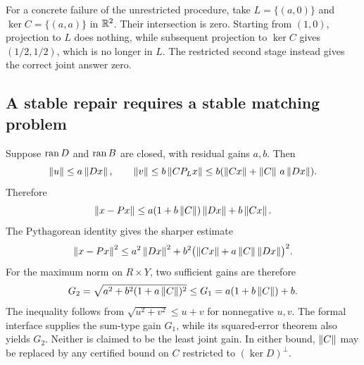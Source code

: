 For a concrete failure of the unrestricted procedure, take \(L=\{(a,0)\}\) and \(\ker C=\{(a,a)\}\) in \(\mathbb R^2\). Their intersection is zero. Starting from \((1,0)\), projection to \(L\) does nothing, while subsequent projection to \(\ker C\) gives \((1/2,1/2)\), which is no longer in \(L\). The restricted second stage instead gives the correct joint answer zero.


\subsection{A stable repair requires a stable matching problem}
Suppose \(\operatorname{ran} D\) and \(\operatorname{ran} B\) are closed, with residual gains \(a,b\). Then
\[
 \left\lVert u\right\rVert\le a\left\lVert Dx\right\rVert,\qquad
 \left\lVert v\right\rVert\le b\left\lVert CP_Lx\right\rVert
 \le b(\left\lVert Cx\right\rVert+\left\lVert C\right\rVert\,a\left\lVert Dx\right\rVert).
\]
Therefore
\begin{equation}\label{eq:jointgain}
 \left\lVert x-Px\right\rVert\le
 a(1+b\left\lVert C\right\rVert)\left\lVert Dx\right\rVert+b\left\lVert Cx\right\rVert.
\end{equation}
The Pythagorean identity gives the sharper estimate
\[
 \left\lVert x-Px\right\rVert^2\le
 a^2\left\lVert Dx\right\rVert^2+b^2\bigl(\left\lVert Cx\right\rVert+a\left\lVert C\right\rVert\left\lVert Dx\right\rVert\bigr)^2.
\]
For the maximum norm on \(R\times Y\), two sufficient gains are therefore
\[
 G_2=\sqrt{a^2+b^2(1+a\left\lVert C\right\rVert)^2}
 \le G_1=a(1+b\left\lVert C\right\rVert)+b.
\]
The inequality follows from \(\sqrt{u^2+v^2}\le u+v\) for nonnegative \(u,v\). The formal interface supplies the sum-type gain \(G_1\), while its squared-error theorem also yields \(G_2\). Neither is claimed to be the least joint gain. In either bound, \(\left\lVert C\right\rVert\) may be replaced by any certified bound on \(C\) restricted to \((\ker D)^\perp\).

